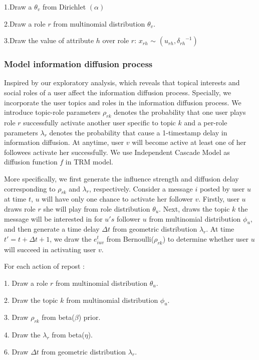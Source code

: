 \documentclass[runningheads,a4paper]{llncs}
\begin{document}
1.Draw a ${\theta _v}$ from Dirichlet $(\alpha)$

2.Draw a role $r$  from multinomial distribution $ {\theta _v}$.

3.Draw the value of attribute $h$ over role $r$: ${x_{rh}}$ $\sim $ $({u_{rh}},{\delta _{rh}}^{ - 1})$


\subsubsection{\textbf{Model information diffusion process}}
Inspired by our exploratory analysis, which reveals that topical interests and social roles of a user affect the information diffusion process. Specially, we incorporate the user topics and roles in the information diffusion process. We introduce topic-role parameters ${\rho _{rk}}$ denotes the probability that one user plays role $r$ successfully activate another user specific to topic $k$ and a per-role parameters ${\lambda _r}$ denotes the probability that cause a 1-timestamp delay in information diffusion. At anytime, user $v$ will become active at least one of her followees activate her successfully. We use Independent Cascade Model as diffusion function $f$ in TRM model.

More specifically, we first generate the influence strength and diffusion delay corresponding to ${\rho _{rk}}$ and ${\lambda _r}$, respectively.
Consider a message $i$ posted by user $u$ at time $t$, $u$ will have only one chance to activate her follower $v$. Firstly, user $u$ draws role $r$ she will play from role distribution ${\theta _{u}}$. Next, draws the topic $k$ the message will be interested in for $u's$ follower $u$ from multinomial distribution ${\phi _u}$, and then generate a time delay $\Delta t$  from  geometric distribution ${\lambda _r}$. At time $t' = t + \Delta t + 1$, we draw the $e_{iuv}^t$ from Bernoulli(${\rho _{rk}}$) to determine whether user $u$ will succeed in activating user $v$.

For each action of repost :

1. Draw a role $r$ from  multinomial distribution ${\theta _{u}}$.

2. Draw the topic $k$ from multinomial distribution ${\phi _u}$.

3. Draw ${\rho _{rk}}$ from beta($\beta$) prior.

4. Draw the ${\lambda _r}$ from beta($\eta$).

6. Draw $\Delta t$ from geometric distribution ${\lambda _r}$.
\end{document}
